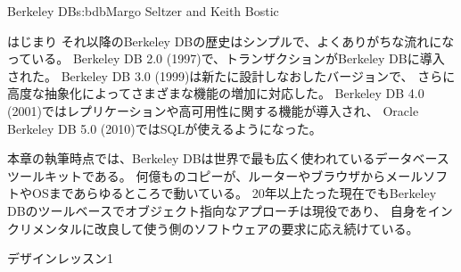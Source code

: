 \begin{aosachapter}{Berkeley DB}{s:bdb}{Margo Seltzer and Keith Bostic}
\begin{aosasect1}{はじまり}
それ以降のBerkeley DBの歴史はシンプルで、よくありがちな流れになっている。
Berkeley DB 2.0 (1997)で、トランザクションがBerkeley DBに導入された。
Berkeley DB 3.0 (1999)は新たに設計しなおしたバージョンで、
さらに高度な抽象化によってさまざまな機能の増加に対応した。
Berkeley DB 4.0 (2001)ではレプリケーションや高可用性に関する機能が導入され、
Oracle Berkeley DB 5.0 (2010)ではSQLが使えるようになった。

本章の執筆時点では、Berkeley DBは世界で最も広く使われているデータベースツールキットである。
何億ものコピーが、ルーターやブラウザからメールソフトやOSまであらゆるところで動いている。
20年以上たった現在でもBerkeley DBのツールベースでオブジェクト指向なアプローチは現役であり、
自身をインクリメンタルに改良して使う側のソフトウェアの要求に応え続けている。

\begin{aosabox}{デザインレッスン1}


\end{aosabox}
\end{aosasect1}
\end{aosachapter}
